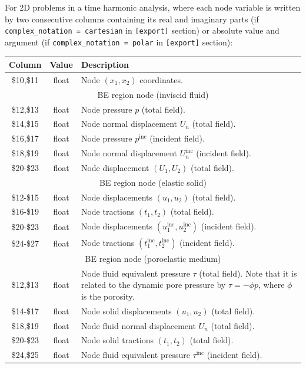 \documentclass[a4paper,fleqn]{book}
\begin{document}
For 2D problems in a time harmonic analysis, where each node variable is written by two consecutive columns containing its real and imaginary parts (if \texttt{complex\_notation = cartesian} in \texttt{[export]} section) or absolute value and argument (if \texttt{complex\_notation = polar} in \texttt{[export]} section):
\begin{longtable}{ccp{11cm}}
\textbf{Column} & \textbf{Value} &\textbf{Description} \\ 
\endhead
\midrule
\$10,\$11 & float & Node $(x_1,x_2)$ coordinates. \\
\midrule
\multicolumn{3}{c}{BE region node (inviscid fluid)} \\
\$12,\$13 & float & Node pressure $p$ (total field). \\
\$14,\$15 & float & Node normal displacement $U_n$ (total field). \\
\$16,\$17 & float & Node pressure $p^\mathrm{inc}$ (incident field). \\
\$18,\$19 & float & Node normal displacement $U_n^\mathrm{inc}$ (incident field). \\
\$20-\$23 & float & Node displacement $(U_1,U_2)$ (total field). \\
\midrule
\multicolumn{3}{c}{BE region node (elastic solid)} \\
\$12-\$15 & float & Node displacements $(u_1,u_2)$ (total field). \\
\$16-\$19 & float & Node tractions $(t_1,t_2)$ (total field). \\
\$20-\$23 & float & Node displacements $(u_1^\mathrm{inc},u_2^\mathrm{inc})$ (incident field). \\
\$24-\$27 & float & Node tractions $(t_1^\mathrm{inc},t_2^\mathrm{inc})$ (incident field). \\
\midrule
\multicolumn{3}{c}{BE region node (poroelastic medium)} \\
\$12,\$13 & float & Node fluid equivalent pressure $\tau$ (total field). Note that it is related to the dynamic pore pressure by $\tau=-\phi p$, where $\phi$ is the porosity.\\
\$14-\$17 & float & Node solid displacements $(u_1,u_2)$ (total field). \\
\$18,\$19 & float & Node fluid normal displacement $U_n$ (total field). \\
\$20-\$23 & float & Node solid tractions $(t_1,t_2)$ (total field). \\
\$24,\$25 & float & Node fluid equivalent pressure $\tau^\mathrm{inc}$ (incident field).\\

\end{longtable}
\end{document}
